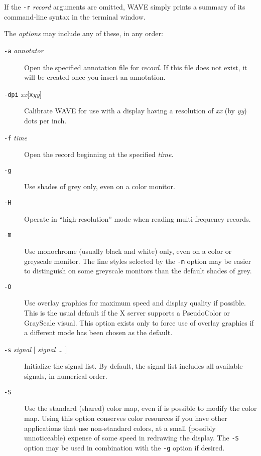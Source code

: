 \documentclass[twoside]{book}
\newcommand{\WAVE}{{\sf WAVE}\xspace}
\begin{document}
If the {\tt -r} \textit{record} arguments are omitted, \WAVE{} simply
prints a summary of its command-line syntax in the terminal window.

The \textit{options} may include any of these, in any order:

\begin{description}

\item[{\tt -a} {\it annotator}]
Open the specified annotation file for \textit{record}.  If this file
does not exist, it will be created once you insert an annotation.

\item[{\tt -dpi} {\it xx}\textrm{{[}{\tt x}}{\it yy}\textrm{]}]
Calibrate \WAVE{} for use with a display having a resolution of
\textit{xx} (by \textit{yy}) dots per inch.

\item[{\tt -f} {\it time}]
Open the record beginning at the specified \textit{time}.

\item[{\tt -g}]
Use shades of grey only, even on a color monitor.

\item[{\tt -H}]
Operate in ``high-resolution'' mode when reading multi-frequency
records.

\item[{\tt -m}]
Use monochrome (usually black and white) only, even on a color or
greyscale monitor.  The line styles selected by the {\tt -m} option
may be easier to distinguish on some greyscale monitors than the
default shades of grey.

\item[{\tt -O}]
Use overlay graphics for maximum speed and display quality if
possible.  This is the usual default if the X server supports a
PseudoColor or GrayScale visual.  This option exists only to force use
of overlay graphics if a different mode has been chosen as the
default.

\item[{\tt -s} {\it signal} \textrm{[} {\it signal \ldots} \textrm{]}]
Initialize the signal list.  By default, the signal list includes all
available signals, in numerical order.

\item[{\tt -S}]
Use the standard (shared) color map, even if is possible to modify the
color map.  Using this option conserves color resources if you have
other applications that use non-standard colors, at a small (possibly
unnoticeable) expense of some speed in redrawing the display.  The
{\tt -S} option may be used in combination with the {\tt -g}
option if desired.
\end{description}
\end{document}
